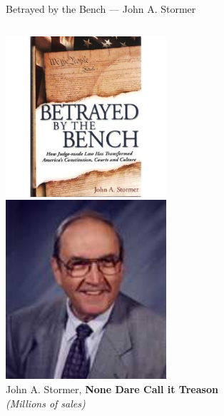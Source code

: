\documentclass{beamer}
\begin{document}
\begin{frame}{Betrayed by the Bench --- John A. Stormer}
    \begin{columns}[onlytextwidth]
            \centering
            \includegraphics[width=0.75\textwidth]{img/betrayed-by-the-bench.png} \\

            \centering
            \includegraphics[width=0.75\textwidth]{img/john-stormer.png} \\
            John A. Stormer, \textbf{None Dare Call it Treason} \\
            \emph{(Millions of sales)} \\
    \end{columns}
\end{frame}
\end{document}
